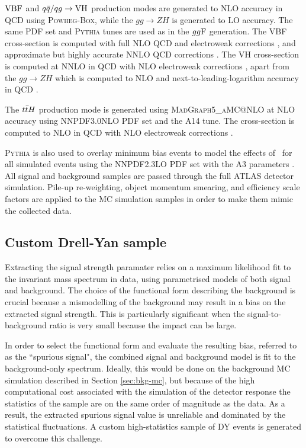 $\text{VBF}$ and $q\bar{q}/qg \rightarrow \text{VH}$ production modes are
generated to NLO accuracy in QCD using \textsc{Powheg-Box},
while the $gg \rightarrow ZH$ is generated to LO accuracy. The same
PDF set and \textsc{Pythia} tunes are used as in the $gg\text{F}$
generation. The VBF cross-section is computed with full NLO QCD
and electroweak corrections \cite{Ciccolini:2007jr, Ciccolini:2007ec,
Arnold:2008rz}, and approximate but highly accurate NNLO QCD
corrections \cite{Bolzoni:2010xr}. The VH cross-section is computed at
NNLO in QCD \cite{Brein:2003wg} with NLO electroweak
corrections \cite{Ciccolini:2003jy}, apart from the
$gg \rightarrow ZH$ which is computed to NLO and next-to-leading-logarithm
accuracy in QCD \cite{Ciccolini:2003jy, Brein:2003wg, Brein:2011vx,
Altenkamp:2012sx, Denner:2014cla, Brein:2012ne, Harlander:2014wda,
Harlander:2018yio}.

The $t\bar{t} H$ production mode is generated using \textsc{MadGraph5\_aMC@NLO}
\cite{Alwall:2014hca, Artoisenet:2012st} at NLO accuracy using
NNPDF3.0NLO PDF set and the A14 tune. The cross-section is
computed to NLO in QCD with NLO electroweak corrections
\cite{Yu:2014cka, Beenakker:2002nc}.

\textsc{Pythia} is also used to
overlay minimum bias events to model the effects of \pileup~for all
simulated events using the NNPDF2.3LO PDF set \cite{Ball:2012cx}
with the A3 parameters \cite{ATL-PHYS-PUB-2016-017}. All signal
and background samples are passed through the full ATLAS
detector simulation. Pile-up re-weighting, object momentum
smearing, and efficiency scale factors are applied to the MC
simulation samples in order to make them mimic the collected data.

\subsection{Custom Drell-Yan sample}
\label{sec:hmumu:customDY}

Extracting the signal strength paramater relies on a
maximum likelihood fit to the invariant mass spectrum in data,
using parametrised models of both signal and background. The choice
of the functional form describing the background is crucial because
a mismodelling of the background may result in a bias on the extracted
signal strength. This is particularly significant when the
signal-to-background ratio is very small because the impact can be
large.

In order to select the functional form and evaluate the resulting
bias, referred to as the ``spurious signal", the combined signal and background model is fit to the
background-only spectrum. Ideally, this would be done
on the background MC simulation described in Section \ref{sec:bkg-mc},
but because of the high computational cost associated with the 
simulation of the detector response the statistics of the sample
are on the same order of magnitude as the data. As a result,
the extracted spurious signal value is unreliable and dominated by
the statistical fluctuations. A custom high-statistics sample of DY
events is generated to overcome this challenge.

